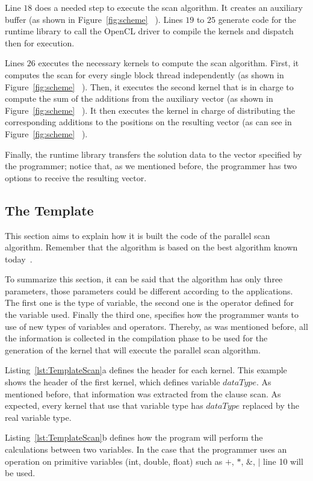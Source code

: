 \documentclass[Ingles]{ic-tese-v1}
\newcommand{\rfig}[1]{Figure~\ref{fig:#1}}
\newcommand{\rlst}[1]{Listing~\ref{lst:#1}}
\begin{document}
Line $18$ does a needed step to execute the scan algorithm. It creates an
auxiliary buffer (as shown in \rfig{scheme} ~).  Lines $19$ to $25$
generate code for the runtime library to call the OpenCL driver to compile the
kernels and dispatch then for execution.

Lines $26$ executes the necessary kernels to compute the scan
algorithm. First, it computes the scan for every single block thread
independently (as shown in \rfig{scheme} ~). Then, it executes
the second kernel that is in charge to compute the sum of the additions from the
auxiliary vector (as shown in \rfig{scheme} ~). It then executes
the kernel in charge of distributing the corresponding additions to the
positions on the resulting vector (as can see in \rfig{scheme} ~).

Finally, the runtime library transfers the solution  data to the vector
specified by the programmer; notice that, as we mentioned before,
the programmer has two options to receive the resulting vector.

\subsection{The Template}
\label{sec:template}

This section aims to explain how it is built the code of the parallel scan
algorithm.  Remember that the algorithm is based on the best algorithm known
today~\cite{Sengupta:2007}.

To summarize this section, it can be said that the algorithm has only three
parameters, those parameters could be different according to the applications.
The first one is the  type of variable, the second one is the operator defined
for the variable used. Finally the third one, specifies how the programmer
wants to  use of new types of variables and operators.
Thereby, as was mentioned before, all the information is collected in the
compilation phase to be used for the generation of the kernel that will execute the parallel
scan algorithm.

\rlst{TemplateScan}{a} defines the header for each kernel. This example shows
the header of the first kernel, which
defines  variable $dataType$. As mentioned before, that information was
extracted from the clause scan. As expected, every kernel that use
that variable type has  $dataType$  replaced  by the real variable type.

\rlst{TemplateScan}{b} defines how the program will perform the calculations
between two variables. In the case that the programmer uses an operation on primitive  variables (int, double, float) such as $+$, $*$, $\&$, $|$ line 10 will be used.
\end{document}
